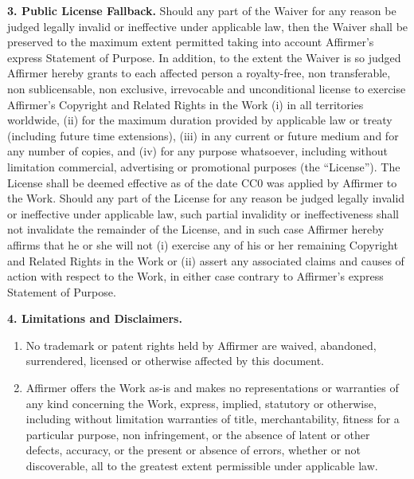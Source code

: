 {  \noindent \textbf{3. Public License Fallback.} Should any
  part of the Waiver for any reason be judged legally invalid or
  ineffective under applicable law, then the Waiver shall be
  preserved to the maximum extent permitted taking into account
  Affirmer's express Statement of Purpose. In addition, to the
  extent the Waiver is so judged Affirmer hereby grants to each
  affected person a royalty-free, non transferable, non
  sublicensable, non exclusive, irrevocable and unconditional
  license to exercise Affirmer's Copyright and Related Rights
  in the Work (i) in all territories worldwide, (ii) for the
  maximum duration provided by applicable law or treaty
  (including future time extensions), (iii) in any current or
  future medium and for any number of copies, and (iv) for any
  purpose whatsoever, including without limitation commercial,
  advertising or promotional purposes (the ``License''). The
  License shall be deemed effective as of the date CC0 was
  applied by Affirmer to the Work. Should any part of the
  License for any reason be judged legally invalid or
  ineffective under applicable law, such partial invalidity or
  ineffectiveness shall not invalidate the remainder of the
  License, and in such case Affirmer hereby affirms that he or
  she will not (i) exercise any of his or her remaining
  Copyright and Related Rights in the Work or (ii) assert any
  associated claims and causes of action with respect to the
  Work, in either case contrary to Affirmer's express Statement
  of Purpose.

  \noindent \textbf{4. Limitations and Disclaimers.}

  \begin{enumerate}[noitemsep,label=\alph*.]
    
    \item No trademark or patent rights held by Affirmer are
    waived, abandoned, surrendered, licensed or otherwise
    affected by this document.
    
    \item Affirmer offers the Work as-is and makes no
    representations or warranties of any kind concerning the
    Work, express, implied, statutory or otherwise, including
    without limitation warranties of title, merchantability,
    fitness for a particular purpose, non infringement, or the
    absence of latent or other defects, accuracy, or the present
    or absence of errors, whether or not discoverable, all to
    the greatest extent permissible under applicable law.
    

\end{enumerate}}
